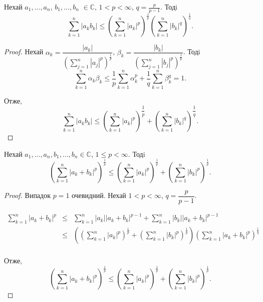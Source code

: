 \begin{corollary}
    Нехай $a_1, ..., a_n$, $b_1, ..., b_n$ $\in \mathbb{C}$, $1 < p < \infty$,
    $q = \frac{p}{p-1}$. Тодi
    $$\sum\limits_{k=1}^{n} |a_k b_k|
    \leqslant \left( \sum\limits_{k=1}^{n} |a_k|^p \right)^{\frac{1}{p}} \left( \sum\limits_{k=1}^{n} |b_k|^q \right)^{\frac{1}{q}}.$$
\end{corollary}
\begin{proof}
    Нехай $\alpha_k = \dfrac{|a_k|}{\left( \sum\limits_{j=1}^{n} |a_j|^p \right)^{\frac{1}{p}}}$,
    $\beta_k = \dfrac{|b_k|}{\left( \sum\limits_{j=1}^{n} |b_j|^p \right)^{\frac{1}{p}}}$.
    Тодi
    $$\sum\limits_{k=1}^n \alpha_k \beta_k \leqslant
    \dfrac{1}{p} \sum\limits_{k=1}^n \alpha_k^p + \dfrac{1}{q} \sum\limits_{k=1}^n \beta_k^q
    = 1.$$
    
    Отже,
    $$\sum\limits_{k=1}^n |a_k b_k| \leqslant
    \left( \sum\limits_{k=1}^n |a_k|^p\right)^{\dfrac{1}{p}} + \left( \sum\limits_{k=1}^n |b_k|^q\right)^{\dfrac{1}{q}}.$$
\end{proof}

\begin{corollary}
    Нехай $a_1, ..., a_n, b_1, ..., b_n \in \mathbb{C}$, $1 \leqslant p < \infty$. Тодi
    $$\left( \sum\limits_{k=1}^n |a_k + b_k|^p \right)^{\frac{1}{p}} \leqslant
    \left( \sum\limits_{k=1}^n |a_k|^p \right)^{\frac{1}{p}} + \left( \sum\limits_{k=1}^n |b_k|^p \right)^{\frac{1}{p}}.$$
\end{corollary}
\begin{proof}
    Випадок $p = 1$ очевидний. Нехай $1 < p < \infty$, $q = \dfrac{p}{p-1}$.
    
    $$\begin{array}{rcl}
        \sum\limits_{k=1}^{n} |a_k + b_k|^p
        & \leqslant & \sum\limits_{k=1}^{n} |a_k| |a_k + b_k|^{p-1} + \sum\limits_{k=1}^{n} |b_k| |a_k + b_k|^{p-1}  \\
        & \leqslant &
        \left(
            \left( \sum\limits_{k=1}^n |a_k|^p \right)^{\frac{1}{p}}
            + \left( \sum\limits_{k=1}^n |b_k|^p \right)^{\frac{1}{p}}
        \right) \left( \sum\limits_{k=1}^n |a_k + b_k|^p \right)^{\frac{1}{q}} \\
    \end{array}$$
    
    Отже,
    $$\left( \sum\limits_{k=1}^n |a_k + b_k|^p \right)^{\frac{1}{p}} \leqslant
    \left( \sum\limits_{k=1}^n |a_k|^p \right)^{\frac{1}{p}} + \left( \sum\limits_{k=1}^n |b_k|^p \right)^{\frac{1}{p}}.$$
\end{proof}


